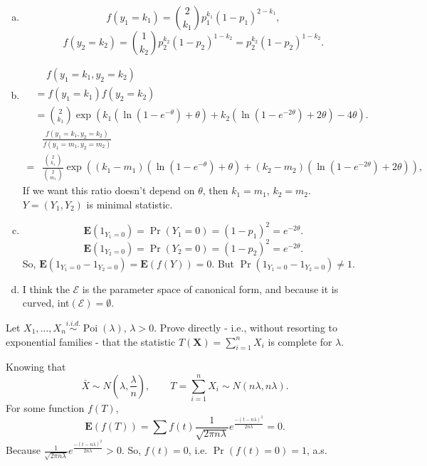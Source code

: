 \begin{solution}
    \begin{enumerate}[(a)]
        \item \[f(y_1=k_1)=\binom{2}{k_1}p_1^{k_1}(1-p_1)^{2-k_1}, \]
        \[f(y_2=k_2)=\binom{1}{k_2}p_2^{k_2}(1-p_2)^{1-k_2}=p_2^{k_2}(1-p_2)^{1-k_2}. \]
        \item \[
            \begin{aligned}
                &\quad\, f(y_1=k_1, y_2=k_2)\\
                &=f(y_1=k_1)f(y_2=k_2)\\
                &=\binom{2}{k_1}\exp\left(k_1\left(\ln\left(1-e^{-\theta}\right)+\theta\right)+k_2\left(\ln\left(1-e^{-2\theta}\right)+2\theta\right)-4\theta\right). 
            \end{aligned}
        \]
        \[
            \begin{aligned}
                &\frac{f(y_1=k_1, y_2=k_2)}{f(y_1=m_1, y_2=m_2)}\\
                ={}&{}\frac{\binom{2}{k_1}}{\binom{2}{m_1}}\exp\left((k_1-m_1)\left(\ln\left(1-e^{-\theta}\right)+\theta\right)+(k_2-m_2)\left(\ln\left(1-e^{-2\theta}\right)+2\theta\right)\right), 
            \end{aligned}
        \]
        If we want this ratio doesn't depend on $\theta$, then $k_1=m_1$, $k_2=m_2$. $Y=(Y_1,Y_2)$ is minimal statistic. 
        \item \[
            \mathbf{E}(1_{Y_1=0})=\Pr(Y_1=0)=(1-p_1)^2=e^{-2\theta}. 
        \]
        \[
            \mathbf{E}(1_{Y_2=0})=\Pr(Y_2=0)=(1-p_2)^2=e^{-2\theta}. 
        \]
        So, $\mathbf{E}(1_{Y_1=0}-1_{Y_2=0})=\mathbf{E}(f(Y))=0$. But $\Pr(1_{Y_1=0}-1_{Y_2=0})\neq 1$. 
        \item I think the $\mathcal{E}$ is the parameter space of canonical form, and because it is curved, int$(\mathcal{E})=\emptyset$. 
    \end{enumerate}
\end{solution}

\begin{ex}
    Let \(X_{1}, \ldots, X_{n} \stackrel{i.i.d. }{\sim} \operatorname{Poi}(\lambda)\), \(\lambda>0\). Prove directly - i.e., without resorting to exponential families - that the statistic \(T(\mathbf{X})=\sum_{i=1}^{n} X_{i}\) is complete for \(\lambda\). 
\end{ex}

\begin{solution}
    Knowing that  
    \[
        \bar{X}\sim N\left(\lambda, \frac{\lambda}{n}\right), \qquad T=\sum_{i=1}^nX_i\sim N\left(n\lambda, n\lambda\right). 
    \]
    For some function $f(T)$, 
    \[
        \mathbf{E}(f(T))=\sum f(t)\frac{1}{\sqrt{2\pi n\lambda}}e^\frac{-(t-n\lambda)^2}{2n\lambda}=0. 
    \]
    Because $\frac{1}{\sqrt{2\pi n\lambda}}e^\frac{-(t-n\lambda)^2}{2n\lambda}>0$. So, $f(t)=0$, i.e. $\Pr(f(t)=0)=1$, a.s. 
\end{solution}


